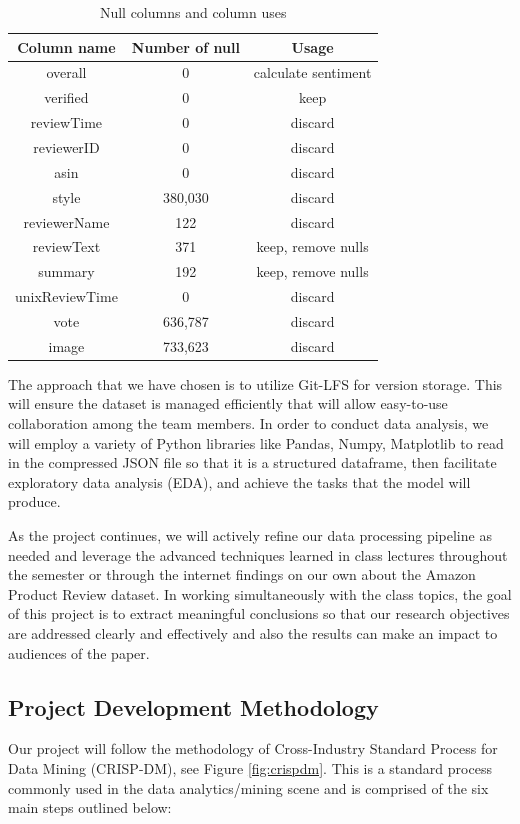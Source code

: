 \documentclass[stu,12pt,floatsintext]{apa7}
\begin{document}
\begin{table}[!htb]
    \centering
    \caption{Null columns and column uses}
    \begin{tabular}{ccc}
        \hline
        Column name & Number of null & Usage \\ 
        \hline
        overall & 0 &calculate sentiment\\
        verified & 0 &keep\\
        reviewTime & 0 &discard\\
        reviewerID & 0 &discard\\
        asin & 0 &discard\\
        style & 380,030 &discard\\
        reviewerName & 122 &discard\\
        reviewText & 371 &keep, remove nulls\\
        summary & 192 &keep, remove nulls\\
        unixReviewTime & 0 &discard\\
        vote & 636,787 &discard\\
        image & 733,623 &discard\\ 
        \hline
    \end{tabular}
    \label{tab:combined-null}
\end{table}

The approach that we have chosen is to utilize Git-LFS for version storage. This will ensure the dataset is managed efficiently that will allow easy-to-use collaboration among the team members. In order to conduct data analysis, we will employ  a variety of Python libraries like Pandas, Numpy, Matplotlib to read in the compressed JSON file so that it is a structured dataframe, then facilitate exploratory data analysis (EDA), and achieve the tasks that the model will produce. 

As the project continues, we will actively refine our data processing pipeline as needed and leverage the advanced techniques learned in class lectures throughout the semester or through the internet findings on our own about the Amazon Product Review dataset. In working simultaneously with the class topics, the goal of this project is to extract meaningful conclusions so that our research objectives are addressed clearly and effectively and also the results can make an impact to audiences of the paper.


\subsection{Project Development Methodology}
Our project will follow the methodology of Cross-Industry Standard Process for Data Mining (CRISP-DM), see Figure \ref{fig:crispdm}. This is a standard process commonly used in the data analytics/mining scene and is comprised of the six main steps outlined below: 
\end{document}
